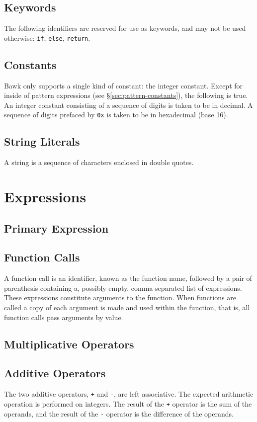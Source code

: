 \documentclass[letterpaper]{article}
\begin{document}
\subsection{Keywords}
The following identifiers are reserved for use as keywords, and may not be used otherwise: \texttt{if}, \texttt{else}, \texttt{return}.

\subsection{Constants}
\label{sec:constants}
Bawk only supports a single kind of constant: the integer constant.  Except for inside of pattern expressions (see \S\ref{sec:pattern-constants}), the following is true.  An integer constant consisting of a sequence of digits is taken to be in decimal.  A sequence of digits prefaced by \texttt{0x} is taken to be in hexadecimal (base 16).

\subsection{String Literals}
A string is a sequence of characters enclosed in double quotes.

\section{Expressions}
\label{sec:expressions}

\subsection{Primary Expression}

\subsection{Function Calls}
A function call is an identifier, known as the function name, followed by a pair of parenthesis containing a, possibly empty, comma-separated list of expressions.  These expressions constitute arguments to the function.  When functions are called a copy of each argument is made and used within the function, that is, all function calls pass arguments by value.

\subsection{Multiplicative Operators}

\subsection{Additive Operators}
The two additive operators, \texttt{+} and \texttt{-}, are left associative.  The expected arithmetic operation is performed on integers.  The result of the \texttt{+} operator is the sum of the operands, and the result of the \texttt{-} operator is the difference of the operands.
\end{document}

